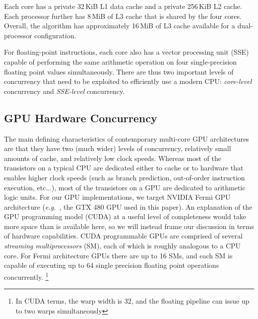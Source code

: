 \documentclass[preprint]{sigplanconf}
\def\eg{\emph{e.g.\ }}
\begin{document}
Each core has a private 32\,KiB L1 data cache and a private 256\,KiB L2 cache.
Each processor further has 8\,MiB of L3 cache that is shared by the four cores.
Overall, the algorithm has approximately 16\,MiB of L3 cache
available for a dual-processor configuration.  

For floating-point instructions, each core also has a vector processing unit
(SSE) capable of performing the same arithmetic operation on four single-precision 
floating point values simultaneously.
There are thus two important levels of concurrency that need to be exploited to
efficiently use a modern CPU: {\em core-level} concurrency and {\em SSE-level}
concurrency. 

\subsection{GPU Hardware Concurrency} \vspace{-0.06in}
The main defining characteristics of contemporary multi-core GPU architectures
are that they have two (much wider) levels of concurrency, relatively small amounts of
 cache, and relatively low clock speeds.  Whereas most of the transistors on
a typical CPU are dedicated either to cache or to hardware that enables higher
clock speeds (such as branch prediction, out-of-order instruction execution, etc...),
most of the transistors on a GPU are dedicated to arithmetic logic units.
For our GPU implementations, we target NVIDIA Fermi GPU architecture (\eg, the GTX 480
GPU used in this paper).  An explanation of the GPU programming model (CUDA) at a useful level of completeness would take more space than is available here, so we will instead frame our discussion in terms of 
hardware capabilities. 
CUDA programmable GPUs are comprised of several
\emph{streaming multiprocessors} (SM), each of which is roughly analogous to a CPU core.
For Fermi architecture GPUs there are up to 16 SMs, and each SM is capable of executing up to 64 single precision 
floating point operations
concurrently. \footnote{In CUDA terms, the warp width is 32, and the floating pipeline can
issue up to two warps simultaneously}
\end{document}
